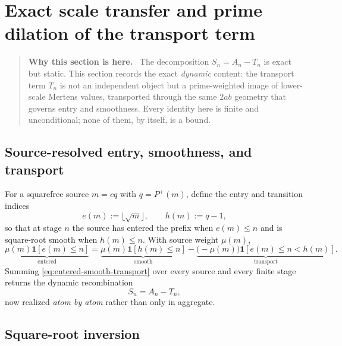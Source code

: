 \documentclass[11pt]{article}
\theoremstyle{definition}
\theoremstyle{remark}
\newcommand{\Pplus}{P^{+}}
\newcommand{\1}{\mathbf{1}}
\newenvironment{motivation}
  {\begin{quote}\small\color{ovvogray}\textbf{Why this section is here.}\ }
  {\end{quote}}
\begin{document}
\section{Exact scale transfer and prime dilation of the transport term}
\label{sec:scale-transfer}

\begin{motivation}
The decomposition $S_n=A_n-T_n$ is exact but static.  This section records the exact \emph{dynamic} content: the transport term $T_n$ is not an independent object but a prime-weighted image of lower-scale Mertens values, transported through the same $2ab$ geometry that governs entry and smoothness.  Every identity here is finite and unconditional; none of them, by itself, is a bound.
\end{motivation}

\subsection{Source-resolved entry, smoothness, and transport}

For a squarefree source $m=cq$ with $q=\Pplus(m)$, define the entry and transition indices
\begin{equation}
 e(m):=\lfloor\sqrt m\rfloor,
 \qquad
 h(m):=q-1,
 \label{eq:entry-transition-indices}
\end{equation}
so that at stage $n$ the source has entered the prefix when $e(m)\le n$ and is square-root smooth when $h(m)\le n$.  With source weight $\mu(m)$,
\begin{equation}
 \underbrace{\mu(m)\mathbf 1[e(m)\le n]}_{\text{entered}}
 =\underbrace{\mu(m)\mathbf 1[h(m)\le n]}_{\text{smooth}}
 -\underbrace{\bigl(-\mu(m)\bigr)\mathbf 1[e(m)\le n<h(m)]}_{\text{transport}} .
 \label{eq:entered-smooth-transport}
\end{equation}
Summing \cref{eq:entered-smooth-transport} over every source and every finite stage returns the dynamic recombination
\begin{equation}
 S_n=A_n-T_n,
 \label{eq:dynamic-recombination}
\end{equation}
now realized \emph{atom by atom} rather than only in aggregate.

\subsection{Square-root inversion}
\end{document}
